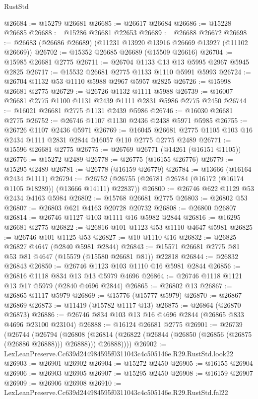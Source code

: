 \begin{lexlean}{RustStd}
\begin{coremodule}
@26684 := @15279 @26681
@26685 := @26617 @26684
@26686 := @15228 @26685
@26688 := @15286 @26681 @22653
@26689 := @26688 @26672
@26698 := @26683 (@26686 @26689) (@11231 @13920 @13916 @26669 @13927 (@11102 @26669))
@26702 := @15352 @26685 @26689 (@15509 @26616)
@26704 := @15985 @26681 @2775
@26711 := @26704 @1133 @13 @13 @5995 @2967 @5945 @2825
@26717 := @15532 @26681 @2775 @1133 @1110 @5991 @5993
@26724 := @26704 @1132 @53 @1110 @5988 @2967 @5957 @2825
@26726 := @15998 @26681 @2775
@26729 := @26726 @1132 @1111 @5988
@26739 := @16007 @26681 @2775 @1100 @1131 @2439 @1111 @2831 @5986 @2775 @2450
@26744 := @16021 @26681 @2775 @1131 @2439 @5986
@26746 := @16030 @26681 @2775
@26752 := @26746 @1107 @1130 @2436 @2438 @5971 @5985
@26755 := @26726 @1107 @2436 @5971
@26769 := @16045 @26681 @2775 @1105 @103 @16 @2434 @1111 @2831 @2844 @16057 @110 @2775 @2775 @2489
@26771 := @15596 @26681 @2775
@26775 := @26769 @26771 (@14261 (@16151 @1105))
@26776 := @15272 @2489
@26778 := @26775 (@16155 @26776)
@26779 := @15295 @2489
@26781 := @26778 (@16159 @26779)
@26784 := @13666 (@16164 @2434 @1111)
@26794 := @26752 (@26755 (@26781 @26784 (@16172 (@16174 @1105 @18289)) (@13666 @14111) @22837))
@26800 := @26746 @622 @1129 @53 @2434 @4163 @5984
@26802 := @15768 @26681 @2775
@26803 := @26802 @53
@26807 := @26803 @621 @4163 @20728 @20732
@26808 := @26800 @26807
@26814 := @26746 @1127 @103 @1111 @16 @5982 @2844
@26816 := @16295 @26681 @2775
@26822 := @26816 @101 @1123 @53 @1110 @4647 @5981
@26825 := @26746 @101 @1125 @53
@26827 := @10 @1110 @16
@26832 := @26825 @26827 @4647 (@2840 @5981 @2844)
@26843 := @15571 @26681 @2775 @81 @53 @81 @4647 (@15579 (@15580 @26681 @81)) @22818
@26844 := @26832 @26843
@26850 := @26746 @1123 @103 @1110 @16 @5981 @2844
@26856 := @26816 @1118 @834 @13 @13 @5979 @4696
@26864 := @26746 @1118 @1121 @13 @17 @5979 (@2840 @4696 @2844)
@26865 := @26802 @13
@26867 := @26865 @1117 @5979
@26869 := @15776 (@15777 @5979)
@26870 := @26867 @26869
@26873 := @11419 (@15782 @1117 @13)
@26875 := @26864 (@26870 @26873)
@26886 := @26746 @834 @103 @13 @16 @4696 @2844 (@26865 @833 @4696 @23100 @23104)
@26888 := @16124 @26681 @2775
@26901 := @26739
    (@26744
      (@26794
        (@26808
          (@26814 (@26822 (@26844 (@26850 (@26856 (@26875 (@26886 @26888))) @26888))) @26888))))
@26902 := LexLeanPreserve.Cc639d244984595f0311043c4c505146e.R29.RustStd.look22
@26903 := @26901 @26902
@26904 := @15272 @2450
@26905 := @16155 @26904
@26906 := @26903 @26905
@26907 := @15295 @2450
@26908 := @16159 @26907
@26909 := @26906 @26908
@26910 := LexLeanPreserve.Cc639d244984595f0311043c4c505146e.R29.RustStd.fal22

\end{coremodule}
\end{lexlean}
